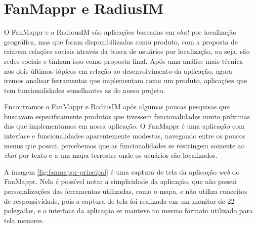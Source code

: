 \section{FanMappr e RadiusIM}
O FanMappr \cite{fanmappr} e o RadiousIM \cite{radiusim} são aplicações baseadas em \textit{chat} por localização geográfica, mas que foram disponibilizadas como produto, com a proposta de criarem relações sociais através da busca de usuários por localização, ou seja, são redes sociais e tinham isso como proposta final. Após uma análise mais técnica nos dois últimos tópicos em relação ao desenvolvimento da aplicação, agora iremos analisar ferramentas que implementam como um produto, aplicações que tem funcionalidades semelhantes as do nosso projeto.

Encontramos o FanMappr e RadiusIM após algumas poucas pesquisas que buscavam especificamente produtos que tivessem funcionalidades muito próximas das que implementamos em nossa aplicação. O FanMappr é uma aplicação com interface e funcionalidades aparentemente modestas, navegando entre os poucos menus que possui, percebemos que as funcionalidades se restringem somente ao \textit{chat} por texto e a um mapa terrestre onde os usuários são localizados.

A imagem \ref{fig:fanmappr-principal} é uma captura de tela da aplicação \textit{web} do FanMappr. Nela é possível notar a simplicidade da aplicação, que não possui personalizações das ferramentas utilizadas, como o mapa, e não utiliza conceitos de responsividade, pois a captura de tela foi realizada em um monitor de 22 polegadas, e a interface da aplicação se manteve no mesmo formato utilizado para tela menores.

